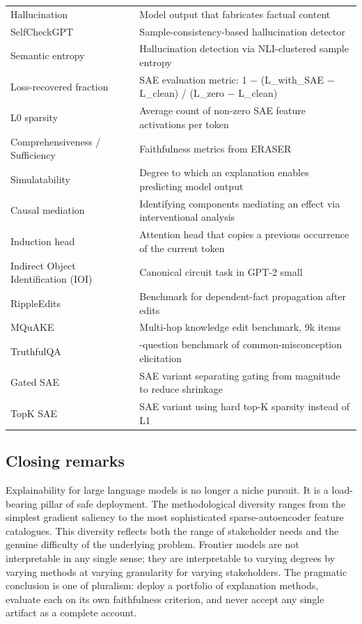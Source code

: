 {\begin{longtable}[]{@{}
  >{\raggedright\arraybackslash}p{}
  >{\raggedright\arraybackslash}p{}@{}}
Hallucination & Model output that fabricates factual content \\
SelfCheckGPT & Sample-consistency-based hallucination detector \\
Semantic entropy & Hallucination detection via NLI-clustered sample entropy \\
Loss-recovered fraction & SAE evaluation metric: 1 − (L\_with\_SAE − L\_clean) / (L\_zero − L\_clean) \\
L0 sparsity & Average count of non-zero SAE feature activations per token \\
Comprehensiveness / Sufficiency & Faithfulness metrics from ERASER \\
Simulatability & Degree to which an explanation enables predicting model output \\
Causal mediation & Identifying components mediating an effect via interventional analysis \\
Induction head & Attention head that copies a previous occurrence of the current token \\
Indirect Object Identification (IOI) & Canonical circuit task in GPT-2 small \\
RippleEdits & Benchmark for dependent-fact propagation after edits \\
MQuAKE & Multi-hop knowledge edit benchmark, 9k items \\
TruthfulQA & 817-question benchmark of common-misconception elicitation \\
Gated SAE & SAE variant separating gating from magnitude to reduce shrinkage \\
TopK SAE & SAE variant using hard top-K sparsity instead of L1 \\
\end{longtable}
}

\subsection{Closing remarks}\label{closing-remarks}

Explainability for large language models is no longer a niche pursuit. It is a load-bearing pillar of safe deployment. The methodological diversity ranges from the simplest gradient saliency to the most sophisticated sparse-autoencoder feature catalogues. This diversity reflects both the range of stakeholder needs and the genuine difficulty of the underlying problem. Frontier models are not interpretable in any single sense; they are interpretable to varying degrees by varying methods at varying granularity for varying stakeholders. The pragmatic conclusion is one of pluralism: deploy a portfolio of explanation methods, evaluate each on its own faithfulness criterion, and never accept any single artifact as a complete account.

